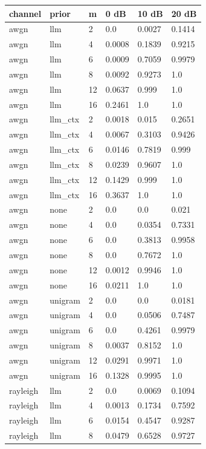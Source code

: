 \begin{tabular}{llllll}
\hline
channel & prior & m & 0 dB & 10 dB & 20 dB \\
\hline
awgn & llm & 2 & 0.0 & 0.0027 & 0.1414 \\
awgn & llm & 4 & 0.0008 & 0.1839 & 0.9215 \\
awgn & llm & 6 & 0.0009 & 0.7059 & 0.9979 \\
awgn & llm & 8 & 0.0092 & 0.9273 & 1.0 \\
awgn & llm & 12 & 0.0637 & 0.999 & 1.0 \\
awgn & llm & 16 & 0.2461 & 1.0 & 1.0 \\
awgn & llm\_ctx & 2 & 0.0018 & 0.015 & 0.2651 \\
awgn & llm\_ctx & 4 & 0.0067 & 0.3103 & 0.9426 \\
awgn & llm\_ctx & 6 & 0.0146 & 0.7819 & 0.999 \\
awgn & llm\_ctx & 8 & 0.0239 & 0.9607 & 1.0 \\
awgn & llm\_ctx & 12 & 0.1429 & 0.999 & 1.0 \\
awgn & llm\_ctx & 16 & 0.3637 & 1.0 & 1.0 \\
awgn & none & 2 & 0.0 & 0.0 & 0.021 \\
awgn & none & 4 & 0.0 & 0.0354 & 0.7331 \\
awgn & none & 6 & 0.0 & 0.3813 & 0.9958 \\
awgn & none & 8 & 0.0 & 0.7672 & 1.0 \\
awgn & none & 12 & 0.0012 & 0.9946 & 1.0 \\
awgn & none & 16 & 0.0211 & 1.0 & 1.0 \\
awgn & unigram & 2 & 0.0 & 0.0 & 0.0181 \\
awgn & unigram & 4 & 0.0 & 0.0506 & 0.7487 \\
awgn & unigram & 6 & 0.0 & 0.4261 & 0.9979 \\
awgn & unigram & 8 & 0.0037 & 0.8152 & 1.0 \\
awgn & unigram & 12 & 0.0291 & 0.9971 & 1.0 \\
awgn & unigram & 16 & 0.1328 & 0.9995 & 1.0 \\
rayleigh & llm & 2 & 0.0 & 0.0069 & 0.1094 \\
rayleigh & llm & 4 & 0.0013 & 0.1734 & 0.7592 \\
rayleigh & llm & 6 & 0.0154 & 0.4547 & 0.9287 \\
rayleigh & llm & 8 & 0.0479 & 0.6528 & 0.9727 \\

\end{tabular}
